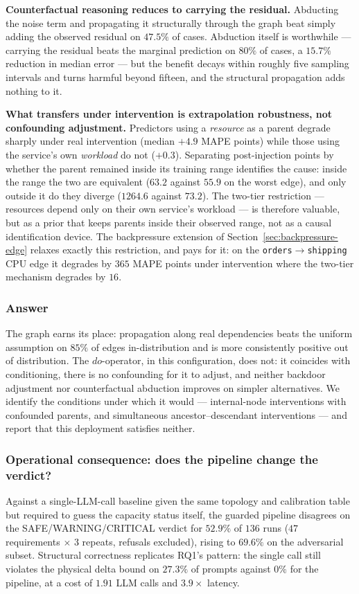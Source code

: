 \documentclass[journal, 10pt]{IEEEtran}
\begin{document}
\textbf{Counterfactual reasoning reduces to carrying the residual.} Abducting the
noise term and propagating it structurally through the graph beat simply adding
the observed residual on $47.5\%$ of cases. Abduction itself is worthwhile
--- carrying the residual beats the marginal prediction on $80\%$ of cases, a
$15.7\%$ reduction in median error --- but the benefit decays within roughly
five sampling intervals and turns harmful beyond fifteen, and the structural
propagation adds nothing to it.

\textbf{What transfers under intervention is extrapolation robustness, not
confounding adjustment.} Predictors using a \emph{resource} as a parent degrade
sharply under real intervention (median $+4.9$ MAPE points) while those using the
service's own \emph{workload} do not ($+0.3$). Separating post-injection points
by whether the parent remained inside its training range identifies the cause:
inside the range the two are equivalent ($63.2$ against $55.9$ on the worst
edge), and only outside it do they diverge ($1264.6$ against $73.2$). The
two-tier restriction --- resources depend only on their own service's workload
--- is therefore valuable, but as a prior that keeps parents inside their
observed range, not as a causal identification device. The backpressure extension
of Section~\ref{sec:backpressure-edge} relaxes exactly this restriction, and pays
for it: on the \texttt{orders}$\to$\texttt{shipping} CPU edge it degrades by
$365$ MAPE points under intervention where the two-tier mechanism degrades by
$16$.

\subsubsection{Answer}
The graph earns its place: propagation along real dependencies beats the uniform
assumption on $85\%$ of edges in-distribution and is more consistently positive
out of distribution. The $do$-operator, in this configuration, does not: it
coincides with conditioning, there is no confounding for it to adjust, and
neither backdoor adjustment nor counterfactual abduction improves on simpler
alternatives. We identify the conditions under which it would --- internal-node
interventions with confounded parents, and simultaneous ancestor--descendant
interventions --- and report that this deployment satisfies neither.


\subsubsection{Operational consequence: does the pipeline change the verdict?}
\label{sec:rq1-operational}
\label{sec:operational}
Against a single-LLM-call baseline given the same topology and calibration table
but required to guess the capacity status itself, the guarded pipeline disagrees
on the SAFE/WARNING/CRITICAL verdict for $52.9\%$ of $136$ runs ($47$
requirements $\times$ 3 repeats, refusals excluded), rising to $69.6\%$ on the
adversarial subset. Structural correctness replicates RQ1's pattern: the single
call still violates the physical delta bound on $27.3\%$ of prompts against
$0\%$ for the pipeline, at a cost of $1.91$ LLM calls and $3.9{\times}$ latency.
\end{document}
